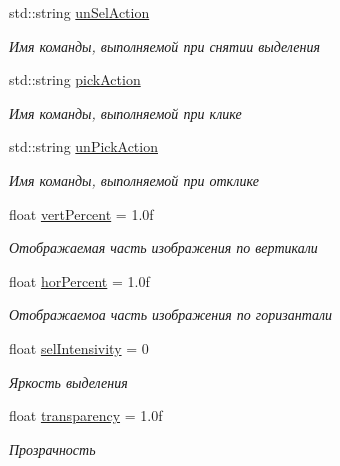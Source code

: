 \begin{DoxyCompactItemize}
std\+::string \hyperlink{struct_interface_element_class_1_1_bitmap_info_a123f95fb00b3697dbbb3c27b3901e264}{un\+Sel\+Action}
\begin{DoxyCompactList}\small\item\em Имя команды, выполняемой при снятии выделения \end{DoxyCompactList}\item 
std\+::string \hyperlink{struct_interface_element_class_1_1_bitmap_info_a960141a78c39d4503cefd06557760af4}{pick\+Action}
\begin{DoxyCompactList}\small\item\em Имя команды, выполняемой при клике \end{DoxyCompactList}\item 
std\+::string \hyperlink{struct_interface_element_class_1_1_bitmap_info_a8a4fd02c86fa2a5e97e7ade3813d62ad}{un\+Pick\+Action}
\begin{DoxyCompactList}\small\item\em Имя команды, выполняемой при отклике \end{DoxyCompactList}\item 
float \hyperlink{struct_interface_element_class_1_1_bitmap_info_ae8de09f2fc720273ccf4621322c3d0b7}{vert\+Percent} = 1.\+0f
\begin{DoxyCompactList}\small\item\em Отображаемая часть изображения по вертикали \end{DoxyCompactList}\item 
float \hyperlink{struct_interface_element_class_1_1_bitmap_info_a133fb1d015b62bbb4514795cabf8d83c}{hor\+Percent} = 1.\+0f
\begin{DoxyCompactList}\small\item\em Отображаемоа часть изображения по горизантали \end{DoxyCompactList}\item 
float \hyperlink{struct_interface_element_class_1_1_bitmap_info_ab995af2f6331d49a6385b05ffb8c8f5a}{sel\+Intensivity} = 0
\begin{DoxyCompactList}\small\item\em Яркость выделения \end{DoxyCompactList}\item 
float \hyperlink{struct_interface_element_class_1_1_bitmap_info_aecc383bb16f457e4a6ebe11a39d72149}{transparency} = 1.\+0f
\begin{DoxyCompactList}\small\item\em Прозрачность \end{DoxyCompactList}\item 

\end{DoxyCompactItemize}
